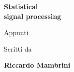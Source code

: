 \documentclass[12pt]{article}
\begin{document}
\begin{titlepage}
    \centering
    \vspace*{\fill} %

    {\LARGE \textbf{Statistical \\ signal processing}\par}
    \vspace{1cm}
    {\large Appunti\par}

    \vspace{3cm}

    {\large Scritti da\par}
    \vspace{0.3cm}
    {\Large \textbf{Riccardo Mambrini}\par}

    \vfill %
\end{titlepage}


\tableofcontents
\newpage
%












%
\end{document}
